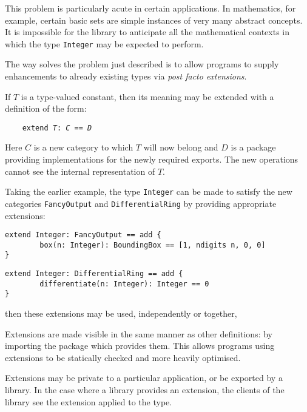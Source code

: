 This problem is particularly acute in certain applications. 
In mathematics, for example, certain basic sets are simple instances
of very many abstract concepts.  It is impossible for the \asharp{}
library to anticipate all the mathematical contexts in which the
type {\tt Integer} may be expected to perform.

The way \asharp{} solves the problem just described is to 
allow programs to supply enhancements to already existing types via
{\em post facto extensions}.


If $T$ is a type-valued constant, then its meaning may be extended with 
a definition of the form:

\verb"    "{\tt extend {\em T\/}:~{\em C} == {\em D} }

Here $C$ is a new category to which $T$ will now belong and $D$ is
a package providing implementations for the newly required exports.
The new operations cannot see the internal representation of $T$.

Taking the earlier example, the type {\tt Integer} can be made to satisfy
the new categories {\tt FancyOutput} and {\tt DifferentialRing}
by providing appropriate extensions:

\begin{small}
\begin{verbatim}
extend Integer: FancyOutput == add {
        box(n: Integer): BoundingBox == [1, ndigits n, 0, 0]
}
\end{verbatim}
\end{small}

\begin{small}
\begin{verbatim}
extend Integer: DifferentialRing == add {
        differentiate(n: Integer): Integer == 0
}
\end{verbatim}
\end{small}

then these extensions may be used, independently or together,

Extensions are made visible in the same manner as other definitions:
by importing the package which provides them.  
This allows programs using extensions to be statically checked
and more heavily optimised.

Extensions may be private to a particular application, or 
be exported by a library.  
In the case where a library provides an
extension, the clients of the library see the extension applied to the type.

